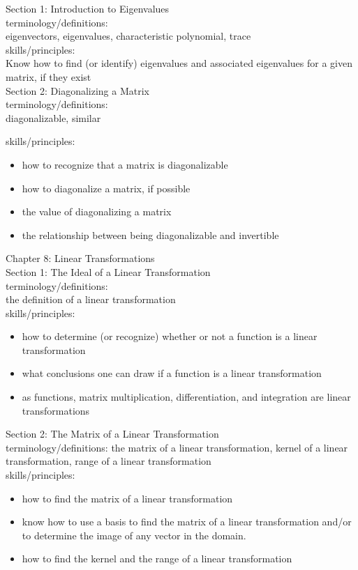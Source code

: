 \documentclass[11pt,fleqn]{article}
\begin{document}
\noindent Section 1: Introduction to Eigenvalues\\

terminology/definitions: \\
eigenvectors, eigenvalues, characteristic polynomial, trace\\

skills/principles: \\
Know how to find (or identify) eigenvalues and associated eigenvalues for a given matrix, if they exist\\

\noindent Section 2: Diagonalizing a Matrix\\

terminology/definitions: \\
diagonalizable, similar

skills/principles: 
\begin{itemize}
\item how to recognize that a matrix is diagonalizable
\item how to diagonalize a matrix, if possible
\item the value of diagonalizing a matrix
\item the relationship between being diagonalizable and invertible\\
\end{itemize}

\noindent Chapter 8: Linear Transformations\\

\noindent Section 1: The Ideal of a Linear Transformation\\


terminology/definitions: \\
the definition of a linear transformation\\

skills/principles: 
\begin{itemize}
\item how to determine (or recognize) whether or not a function is a linear transformation
\item what conclusions one can draw if a function is a linear transformation
\item as functions, matrix multiplication, differentiation, and integration are linear transformations 
\end{itemize}

\noindent Section 2: The Matrix of a Linear Transformation\\
terminology/definitions: the matrix of a linear transformation, kernel of a linear transformation, range of a linear transformation\\

skills/principles: 
\begin{itemize}
\item how to find the matrix of a linear transformation
\item know how to use a basis to find the matrix of a linear transformation and/or to determine the image of any vector in the domain.
\item how to find the kernel and the range of a linear transformation
\end{itemize}
\end{document}
